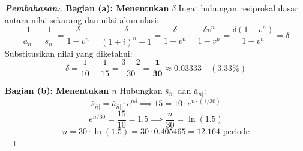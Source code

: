 \documentclass[11pt,a4paper]{article}
\begin{document}
\begin{proof}[\textbf{Pembahasan:}]
\textbf{Bagian (a): Menentukan $\delta$}
Ingat hubungan resiprokal dasar antara nilai sekarang dan nilai akumulasi:
\begin{equation*}
    \frac{1}{\bar{a}_{\overline{n}|}} - \frac{1}{\bar{s}_{\overline{n}|}} = \frac{\delta}{1 - v^n} - \frac{\delta}{(1+i)^n - 1} = \frac{\delta}{1 - v^n} - \frac{\delta v^n}{1 - v^n} = \frac{\delta (1 - v^n)}{1 - v^n} = \delta
\end{equation*}
Substitusikan nilai yang diketahui:
\begin{equation*}
    \delta = \frac{1}{10} - \frac{1}{15} = \frac{3 - 2}{30} = \mathbf{\frac{1}{30}} \approx \mathbf{0.03333} \quad (3.33\%)
\end{equation*}

\textbf{Bagian (b): Menentukan $n$}
Hubungkan $\bar{s}_{\overline{n}|}$ dan $\bar{a}_{\overline{n}|}$:
\begin{equation*}
    \bar{s}_{\overline{n}|} = \bar{a}_{\overline{n}|} \cdot e^{n\delta} \implies 15 = 10 \cdot e^{n \cdot (1/30)}
\end{equation*}
\begin{equation*}
    e^{n/30} = \frac{15}{10} = 1.5 \implies \frac{n}{30} = \ln(1.5)
\end{equation*}
\begin{equation*}
    n = 30 \cdot \ln(1.5) = 30 \cdot 0.405465 = \mathbf{12.164}\text{ periode}
\end{equation*}
\end{proof}
\end{document}
